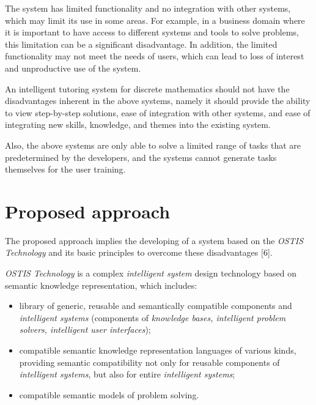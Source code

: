 \documentclass[twocolumn]{scndocument}
\begin{document}
The system has limited functionality and no integration with other systems, which may limit its use in some areas. For example, in a business domain where it is important to have access to different systems and tools to solve problems, this limitation can be a significant disadvantage. In addition, the limited functionality may not meet the needs of users, which can lead to loss of interest and unproductive use of the system.

An intelligent tutoring system for discrete mathematics should not have the disadvantages inherent in the above systems, namely it should provide the ability to view step-by-step solutions, ease of integration with other systems, and ease of integrating new skills, knowledge, and themes into the existing system.

Also, the above systems are only able to solve a limited range of tasks that are predetermined by the developers, and the systems cannot generate tasks themselves for the user training.

\newpage


\setcounter{section}{1}
    \section{Proposed approach}
The proposed approach implies the developing of a system based on the \textit{OSTIS Technology} and its basic principles to overcome these disadvantages [6].

\textit{OSTIS Technology} is a complex \textit{intelligent system} design technology based on semantic knowledge representation, which includes:
\begin{itemize}[noitemsep]
    \item library of generic, reusable and semantically compatible components and \textit{intelligent systems} (components of \textit{knowledge bases, intelligent problem solvers, intelligent user interfaces});
    \item compatible semantic knowledge representation languages of various kinds, providing semantic compatibility not only for reusable components of \textit{intelligent systems}, but also for entire \textit{intelligent systems};
    \item compatible semantic models of problem solving.
\end{itemize}
\end{document}
